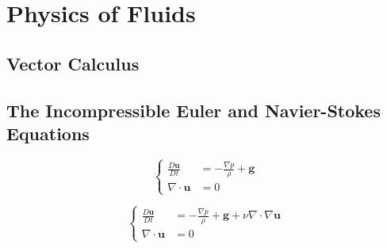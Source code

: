 \chapter{Physics of Fluids}

\section{Vector Calculus}

\section{The Incompressible Euler and Navier-Stokes Equations}
\label{Euler N-S Eqns}


\begin{equation}
    \tag{Euler Equations}
    \left \{
    \begin{aligned}
         \frac{D\textbf{u}}{Dt}   &=   -\frac{\nabla p}{\rho} + \textbf{g} \\
         \nabla \cdot \textbf{u}   &=   0
    \end{aligned} \right.
    \label{eqn:Euler Equations}
\end{equation} 


\begin{equation}
    \tag{Navier-Stokes Equations}
    \left \{
    \begin{aligned}
         \frac{D\textbf{u}}{Dt}   &=   -\frac{\nabla p}{\rho} + \textbf{g} + \nu \nabla \cdot \nabla \textbf{u} \\
         \nabla \cdot \textbf{u}  &=   0
    \end{aligned} \right.
    \label{eqn:Navier-Stokes Equations}
\end{equation} 

